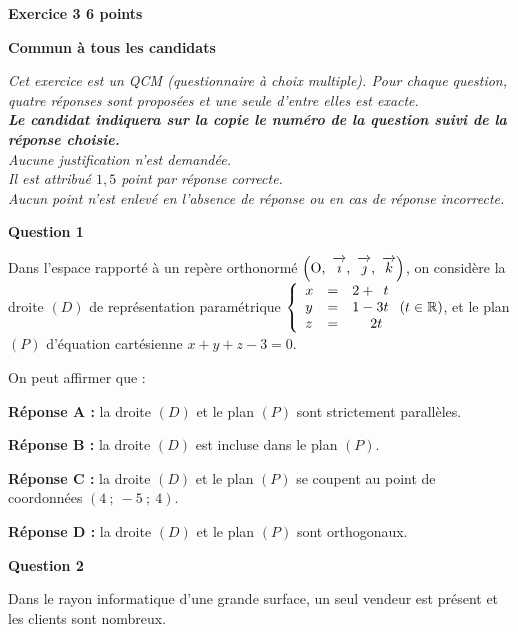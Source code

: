 \documentclass[10pt,a4paper]{article}
\newcommand{\R}{\mathbb{R}}
\newcommand{\vect}[1]{\overrightarrow{\,\mathstrut#1\,}}
\def\Oijk{$\left(\text{O},~\vect{\imath},~\vect{\jmath},~\vect{k}\right)$}
\begin{document}
\vspace{0,5cm}

\textbf{Exercice 3 \hfill 6 points}

\textbf{Commun à tous les candidats }

\bigskip

\emph{Cet exercice est un QCM (questionnaire à choix multiple). Pour chaque question, quatre réponses sont proposées et une seule d'entre elles est exacte.\\
\textbf{Le candidat indiquera sur la copie le numéro de la question suivi de la réponse choisie.}\\
Aucune justification n'est demandée.\\
Il est attribué $1,5$ point par réponse correcte.\\
Aucun point n'est enlevé en l'absence de réponse ou en cas de réponse incorrecte.}

\bigskip

\textbf{Question 1}

\medskip

Dans l'espace rapporté à un repère orthonormé \Oijk, on considère la droite $(D)$ de représentation paramétrique $\left\{\begin{array}{l c l}\index{equation parametrique@équation paramétrique}
x &=&2+ \phantom{3}t\\
y &=& 1 - 3t\\
z &=& \phantom{2 +} 2t 
\end{array}\right. (t \in \R)$, et le plan $(P)$ d'équation cartésienne $x + y + z - 3 = 0$.

\medskip

On peut affirmer que :

\medskip

\textbf{Réponse A :} la droite $(D)$ et le plan $(P)$ sont strictement parallèles.

\textbf{Réponse B :} la droite $(D)$ est incluse dans le plan $(P)$.

\textbf{Réponse C :} la droite $(D)$ et le plan $(P)$ se coupent au point de coordonnées $(4~;~-5~;~4)$.

\textbf{Réponse D :} la droite $(D)$ et le plan $(P)$ sont orthogonaux.

\bigskip
\bigskip

\textbf{Question 2}

\medskip

Dans le rayon informatique d'une grande surface, un seul vendeur est présent et les clients sont nombreux.
\end{document}
